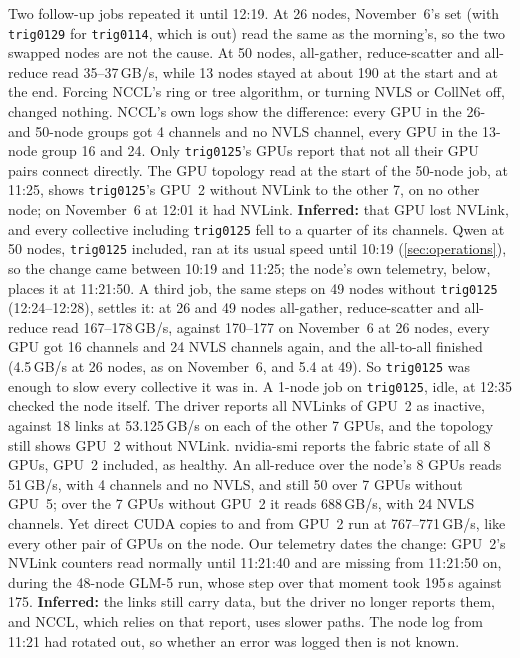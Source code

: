 Two follow-up jobs repeated it until 12:19. At 26 nodes, November~6's set (with \texttt{trig0129} for \texttt{trig0114}, which is out) read the same as the morning's, so the two swapped nodes are not the cause. At 50 nodes, all-gather, reduce-scatter and all-reduce read 35--37\,GB/s, while 13 nodes stayed at about 190 at the start and at the end. Forcing NCCL's ring or tree algorithm, or turning NVLS or CollNet off, changed nothing. NCCL's own logs show the difference: every GPU in the 26- and 50-node groups got 4 channels and no NVLS channel, every GPU in the 13-node group 16 and 24. Only \texttt{trig0125}'s GPUs report that not all their GPU pairs connect directly. The GPU topology read at the start of the 50-node job, at 11:25, shows \texttt{trig0125}'s GPU~2 without NVLink to the other 7, on no other node; on November~6 at 12:01 it had NVLink. \textbf{Inferred:} that GPU lost NVLink, and every collective including \texttt{trig0125} fell to a quarter of its channels. Qwen at 50 nodes, \texttt{trig0125} included, ran at its usual speed until 10:19 (\cref{sec:operations}), so the change came between 10:19 and 11:25; the node's own telemetry, below, places it at 11:21:50. A third job, the same steps on 49 nodes without \texttt{trig0125} (12:24--12:28), settles it: at 26 and 49 nodes all-gather, reduce-scatter and all-reduce read 167--178\,GB/s, against 170--177 on November~6 at 26 nodes, every GPU got 16 channels and 24 NVLS channels again, and the all-to-all finished (4.5\,GB/s at 26 nodes, as on November~6, and 5.4 at 49). So \texttt{trig0125} was enough to slow every collective it was in. A 1-node job on \texttt{trig0125}, idle, at 12:35 checked the node itself. The driver reports all NVLinks of GPU~2 as inactive, against 18 links at 53.125\,GB/s on each of the other 7 GPUs, and the topology still shows GPU~2 without NVLink. nvidia-smi reports the fabric state of all 8 GPUs, GPU~2 included, as healthy. An all-reduce over the node's 8 GPUs reads 51\,GB/s, with 4 channels and no NVLS, and still 50 over 7 GPUs without GPU~5; over the 7 GPUs without GPU~2 it reads 688\,GB/s, with 24 NVLS channels. Yet direct CUDA copies to and from GPU~2 run at 767--771\,GB/s, like every other pair of GPUs on the node. Our telemetry dates the change: GPU~2's NVLink counters read normally until 11:21:40 and are missing from 11:21:50 on, during the 48-node GLM-5 run, whose step over that moment took 195\,s against 175. \textbf{Inferred:} the links still carry data, but the driver no longer reports them, and NCCL, which relies on that report, uses slower paths. The node log from 11:21 had rotated out, so whether an error was logged then is not known.

